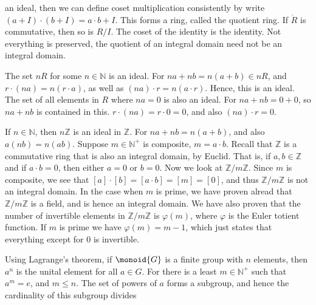             an ideal, then we can define coset multiplication consistently
            by write $(a+I)\cdot(b+I)=a\cdot{b}+I$. This forms a ring,
            called the quotient ring. If $\ring{R}$ is commutative, then
            so is $R/I$. The coset of the identity is the identity. Not
            everything is preserved, the quotient of an integral domain
            need not be an integral domain.
            \begin{example}
                The set $nR$ for some $n\in\mathbb{N}$ is an ideal. For
                $na+nb=n(a+b)\in{n}R$, and $r\cdot(na)=n(r\cdot{a})$, as
                well as $(na)\cdot{r}=n(a\cdot{r})$. Hence, this is an
                ideal. The set of all elements in $R$ where $na=0$ is also
                an ideal. For $na+nb=0+0$, so $na+nb$ is contained in this.
                $r\cdot(na)=r\cdot{0}=0$, and also $(na)\cdot{r}=0$.
            \end{example}
            \begin{example}
                If $n\in\mathbb{N}$, then $n\mathbb{Z}$ is an ideal in
                $\mathbb{Z}$. For $na+nb=n(a+b)$, and also $a(nb)=n(ab)$.
                Suppose $m\in\mathbb{N}^{+}$ is composite, $m=a\cdot{b}$.
                Recall that $\mathbb{Z}$ is a commutative ring that is also
                an integral domain, by Euclid. That is, if
                $a,b\in\mathbb{Z}$ and if $a\cdot{b}=0$, then either $a=0$
                or $b=0$. Now we look at $\mathbb{Z}/m\mathbb{Z}$. Since $m$
                is composite, we see that $[a]\cdot[b]=[a\cdot{b}]=[m]=[0]$,
                and thus $\mathbb{Z}/m\mathbb{Z}$ is not an integral domain.
                In the case when $m$ is prime, we have proven alread that
                $\mathbb{Z}/m\mathbb{Z}$ is a field, and is hence an
                integral domain. We have also proven that the number of
                invertible elements in $\mathbb{Z}/m\mathbb{Z}$ is
                $\varphi(m)$, where $\varphi$ is the Euler totient function.
                If $m$ is prime we have $\varphi(m)=m-1$, which just states
                that everything except for 0 is invertible.
            \end{example}
            Using Lagrange's theorem, if $\monoid{G}$ is a finite group with
            $n$ elements, then $a^{n}$ is the unital element for all
            $a\in{G}$. For there is a least $m\in\mathbb{N}^{+}$ such that
            $a^{m}=e$, and $m\leq{n}$. The set of powers of $a$ forms a
            subgroup, and hence the cardinality of this subgroup divides

